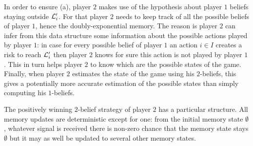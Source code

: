 {In order to ensure (a), player $2$ makes use of the hypothesis
about player $1$ beliefs staying outside $\mathcal{L}_i'$. For that player $2$ needs to keep track of all the possible beliefs of player $1$, hence the doubly-exponential memory.
The reason is player $2$ can infer
from this data structure some information about the possible actions played by player $1$: in case
for every possible belief of player $1$ an action $i\in I$ creates a risk to reach $\mathcal{L}'_i$
then player $2$ knows for sure this action is not played by player $1$.
This in turn helps player $2$ to know which are the possible states of the game.
Finally, when player $2$ estimates the state of the game using his $2$-beliefs,
this gives a potentially more accurate estimation of the possible states than simply computing his $1$-beliefs.}

{The positively winning $2$-belief strategy of player $2$ has a particular structure.
All memory updates are deterministic except for one: from
the initial memory state $\emptyset$,
whatever signal is received there is non-zero chance that the memory state stays $\emptyset$ but it may as well 
be updated to several other memory states.}
\smallskip
